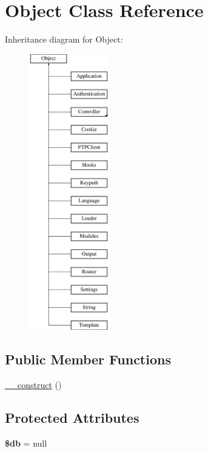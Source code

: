 \hypertarget{class_object}{
\section{Object Class Reference}
\label{class_object}
}
Inheritance diagram for Object:\begin{figure}[H]
\begin{center}
\leavevmode
\includegraphics[height=12.000000cm]{class_object}
\end{center}
\end{figure}
\subsection*{Public Member Functions}
\begin{DoxyCompactItemize}
\item 
\hyperlink{class_object_a095c5d389db211932136b53f25f39685}{\_\-\_\-construct} ()
\end{DoxyCompactItemize}
\subsection*{Protected Attributes}
\begin{DoxyCompactItemize}
\item 
\hypertarget{class_object_a1fa3127fc82f96b1436d871ef02be319}{
{\bfseries \$db} = null}
\label{class_object_a1fa3127fc82f96b1436d871ef02be319}

\end{DoxyCompactItemize}


